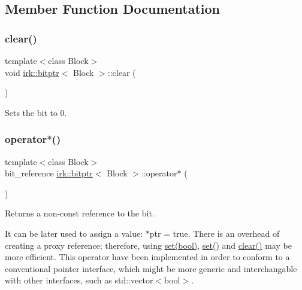 \subsection{Member Function Documentation}
\mbox{\label{classirk_1_1bitptr_acb0f89f9751fc114558234b79d49aac6}} 
\subsubsection{\texorpdfstring{clear()}{clear()}}
{\footnotesize\ttfamily template$<$class Block$>$ \\
void \mbox{\hyperlink{classirk_1_1bitptr}{irk\+::bitptr}}$<$ Block $>$\+::clear (\begin{DoxyParamCaption}{ }\end{DoxyParamCaption})\hspace{0.3cm}{\ttfamily [inline]}}



Sets the bit to 0. 

\mbox{\label{classirk_1_1bitptr_a6676fe4fc076f0cb53587ea48d8634c3}} 
\subsubsection{\texorpdfstring{operator$\ast$()}{operator*()}\hspace{0.1cm}{\footnotesize\ttfamily [1/2]}}
{\footnotesize\ttfamily template$<$class Block$>$ \\
bit\+\_\+reference \mbox{\hyperlink{classirk_1_1bitptr}{irk\+::bitptr}}$<$ Block $>$\+::operator$\ast$ (\begin{DoxyParamCaption}{ }\end{DoxyParamCaption})\hspace{0.3cm}{\ttfamily [inline]}}



Returns a non-\/const reference to the bit. 

It can be later used to assign a value\+: {\ttfamily $\ast$ptr = true}. There is an overhead of creating a proxy reference; therefore, using {\ttfamily \mbox{\hyperlink{classirk_1_1bitptr_ab690150f670134eb879fceb83d892073}{set(bool)}}}, {\ttfamily \mbox{\hyperlink{classirk_1_1bitptr_a11089c343ac361d3ca5d86f8109c2d42}{set()}}} and {\ttfamily \mbox{\hyperlink{classirk_1_1bitptr_acb0f89f9751fc114558234b79d49aac6}{clear()}}} may be more efficient. This operator have been implemented in order to conform to a conventional pointer interface, which might be more generic and interchangable with other interfaces, such as {\ttfamily std\+::vector$<$bool$>$}. \mbox{\label{classirk_1_1bitptr_a4cb8f7ff26e561a9348f79082ad6af35}} 
